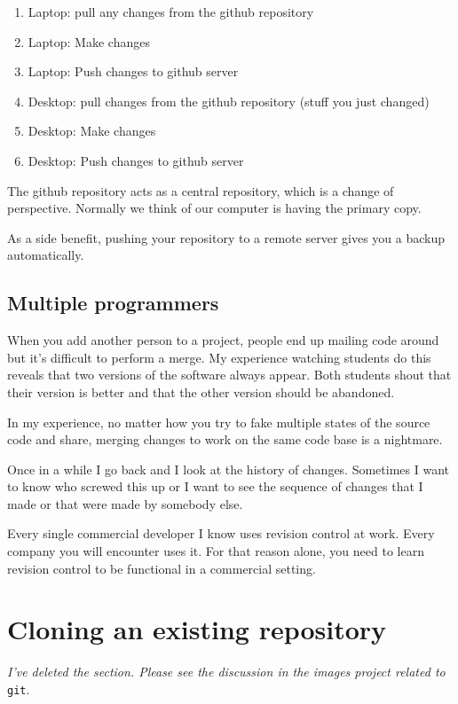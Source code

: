 \documentclass[titlepage]{tufte-book}
\begin{document}
\begin{enumerate}
\item Laptop: pull any changes from the github repository
\item Laptop: Make changes
\item Laptop: Push changes to github server
\item Desktop: pull changes from the github repository (stuff you just changed)
\item Desktop: Make changes
\item Desktop: Push changes to github server
\end{enumerate}

The github repository acts as a central repository, which is a change of perspective. Normally we think of our computer is having the primary copy.

As a side benefit, pushing your repository to a remote server gives you a backup automatically.

\subsection{Multiple programmers}

When you add another person to a project, people end up mailing code around but it's difficult to perform a merge. My experience watching students do this reveals that two versions of the software always appear. Both students shout that their version is better and that the other version should be abandoned.

In my experience, no matter how you try to fake multiple states of the source code and share, merging changes to work on the same code base is a nightmare.

Once in a while I go back and I look at the history of changes. Sometimes I want to know who screwed this up or I want to see the sequence of changes that I made or that were made by somebody else.

Every single commercial developer I know uses revision control at work. Every company you will encounter uses it. For that reason alone, you need to learn revision control to be functional in a commercial setting.

\section{Cloning an existing repository}

{\em I've deleted the section. Please see the discussion in the images project related to} {\tt git}.
\end{document}
